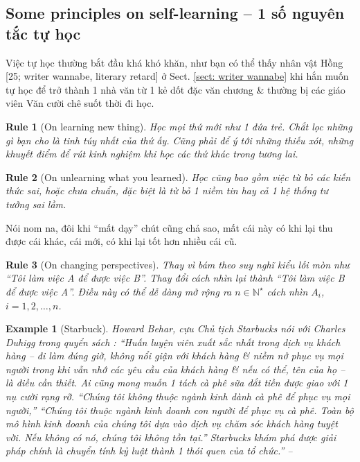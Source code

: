 \documentclass[12pt]{article}
\newtheorem{example}{Example}
\newtheorem{Rule}{Rule}
\begin{document}
\subsection{Some principles on self-learning -- 1 số nguyên tắc tự học}
Việc tự học thường bắt đầu khá khó khăn, như bạn có thể thấy nhân vật {\sf Hồng [25; writer wannabe, literary retard]} ở Sect. \ref{sect: writer wannabe} khi hắn muốn tự học để trở thành 1 nhà văn từ 1 kẻ dốt đặc văn chương \& thường bị các giáo viên Văn cười chê suốt thời đi học.

\begin{Rule}[On learning new thing]
	Học mọi thứ mới như 1 đứa trẻ. Chắt lọc những gì bạn cho là tinh túy nhất của thứ ấy. Cũng phải để ý tới những thiếu xót, những khuyết điểm để rút kinh nghiệm khi học các thứ khác trong tương lai.
\end{Rule}

\begin{Rule}[On unlearning what you learned]
	Học cũng bao gồm việc từ bỏ các kiến thức sai, hoặc chưa chuẩn, đặc biệt là từ bỏ 1 niềm tin hay cả 1 hệ thống tư tưởng sai lầm.
\end{Rule}
Nói nom na, đôi khi ``mất dạy'' chút cũng chả sao, mất cái này có khi lại thu được cái khác, cái mới, có khi lại tốt hơn nhiều cái cũ.

\begin{Rule}[On changing perspectives]
	Thay vì bám theo suy nghĩ kiểu lối mòn như ``Tôi làm việc A để được việc B''. Thay đổi cách nhìn lại thành ``Tôi làm việc B để được việc A''. Điều này có thể dễ dàng mở rộng ra $n\in\mathbb{N}^\star$ cách nhìn $A_i$, $i = 1,2,\ldots,n$.
\end{Rule}

\begin{example}[Starbuck]
	Howard Behar, cựu Chủ tịch Starbucks nói với {\rm Charles Duhigg} trong quyển sách {\rm\cite{Duhigg_habit}}: ``Huấn luyện viên xuất sắc nhất trong dịch vụ khách hàng -- đi làm đúng giờ, không nổi giận với khách hàng \& niềm nở phục vụ mọi người trong khi vẫn nhớ các yêu cầu của khách hàng \& nếu có thể, tên của họ -- là điều cần thiết. Ai cũng mong muốn 1 tách cà phê sữa đắt tiền được giao với 1 nụ cười rạng rỡ. ``Chúng tôi không thuộc ngành kinh dành cà phê để phục vụ mọi người,'' ``Chúng tôi thuộc ngành kinh doanh con người để phục vụ cà phê. Toàn bộ mô hình kinh doanh của chúng tôi dựa vào dịch vụ chăm sóc khách hàng tuyệt vời. Nếu không có nó, chúng tôi không tồn tại.'' Starbucks khám phá được giải pháp chính là chuyển tính kỷ luật thành 1 thói quen của tổ chức.'' -- {\rm\cite[p. 220]{Duhigg_habit_VN}}
\end{example}
\end{document}
